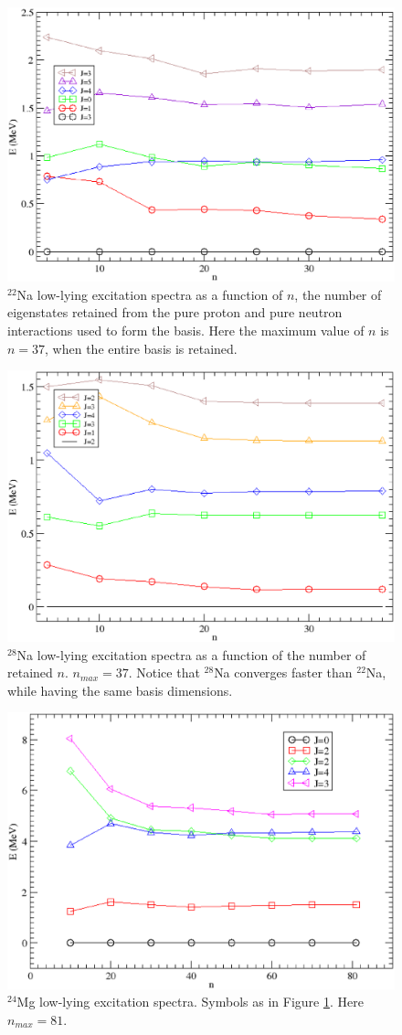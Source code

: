 \begin{figure}
    \centering
    \includegraphics[width=.75\textwidth,clip]{Figures/pnism_ex_22na}
    \caption{$^{22}$Na low-lying excitation spectra as a function of $n$, the number of eigenstates retained from the pure proton and pure neutron
interactions used to form the basis. Here the maximum value of $n$ is $n=37$, when the entire basis is retained.}
    \label{22na}
\end{figure}
\begin{figure}
    \centering
    \includegraphics[width=.75\textwidth,clip]{Figures/pnism_ex_28na}
    \caption{$^{28}$Na low-lying excitation spectra as a function of the number of retained $n$. \boldmath$n_{max}=37$. Notice that $^{28}$Na
    converges faster than $^{22}$Na, while having the same basis dimensions.}
\end{figure}
\begin{figure}
    \centering
    \includegraphics[width=.75\textwidth,clip]{Figures/pnism_ex_24mg}
    \caption{$^{24}$Mg low-lying excitation spectra. Symbols as in Figure \ref{22na}. Here \boldmath$n_{max}=81$.}
\end{figure}
